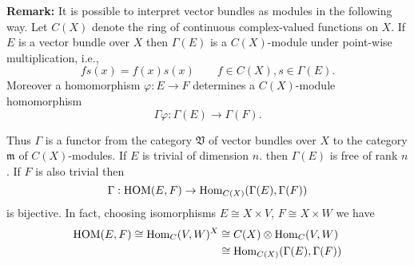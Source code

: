 \textbf{Remark:} It is possible to interpret vector bundles as modules in the following way. Let $C(X)$ denote the ring of continuous complex-valued functions on $X$. If $E$ is a vector bundle over $X$ then $\Gamma(E)$ is a $C(X)$-module under point-wise multiplication, i.e.,
\begin{equation*}
    fs(x) = f(x)s(x) \qquad f \in C(X), s \in \Gamma(E).
\end{equation*}
Moreover a homomorphism $\varphi: E \to F$ determines a $C(X)$-module homomorphism
\begin{equation*}
    \Gamma\varphi: \Gamma(E) \to \Gamma(F).
\end{equation*}

Thus $\Gamma$ is a functor from the category $\mathfrak{V}$ of vector bundles over $X$ to the category $\mathfrak{m}$ of $C(X)$-modules. If $E$ is trivial of dimension $n$. then $\Gamma(E)$ is free of rank $n$. If $F$ is also trivial then
\begin{equation*}
    \Gamma: \operatorname{HOM}(E, F) \to \operatorname{Hom}_{C(X)}(\Gamma(E), \Gamma(F))
\end{equation*}
is bijective. In fact, choosing isomorphisms $E \cong X \times V$, $F \cong X \times W$ we have
\begin{align*}
    \operatorname{HOM}(E, F) \cong \operatorname{Hom}_C(V, W)^X &\cong C(X) \otimes \operatorname{Hom}_C(V, W) \\
    &\cong \operatorname{Hom}_{C(X)}(\Gamma(E), \Gamma(F))
\end{align*}
